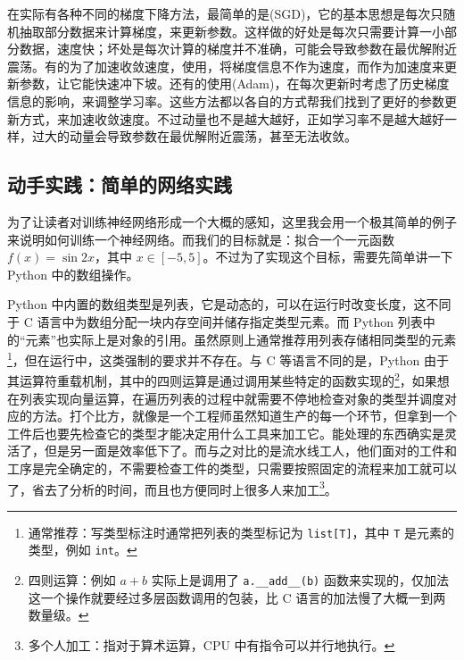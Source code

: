 在实际有各种不同的梯度下降方法，最简单的是(SGD)，它的基本思想是每次只随机抽取部分数据来计算梯度，来更新参数。这样做的好处是每次只需要计算一小部分数据，速度快；坏处是每次计算的梯度并不准确，可能会导致参数在最优解附近震荡。有的为了加速收敛速度，使用，将梯度信息不作为速度，而作为加速度来更新参数，让它能快速冲下坡。还有的使用(Adam)，在每次更新时考虑了历史梯度信息的影响，来调整学习率。这些方法都以各自的方式帮我们找到了更好的参数更新方式，来加速收敛速度。不过动量也不是越大越好，正如学习率不是越大越好一样，过大的动量会导致参数在最优解附近震荡，甚至无法收敛。

\newpage

\subsection*{动手实践：简单的网络实践}

为了让读者对训练神经网络形成一个大概的感知，这里我会用一个极其简单的例子来说明如何训练一个神经网络。而我们的目标就是：拟合一个一元函数 $f(x) = \sin 2x$，其中 $x \in [-5, 5]$。不过为了实现这个目标，需要先简单讲一下 Python 中的数组操作。

Python 中内置的数组类型是列表，它是动态的，可以在运行时改变长度，这不同于 C 语言中为数组分配一块内存空间并储存指定类型元素。而 Python 列表中的“元素”也实际上是对象的引用。虽然原则上通常推荐用列表存储相同类型的元素\footnote{通常推荐：写类型标注时通常把列表的类型标记为 \texttt{list[T]}，其中 \texttt{T} 是元素的类型，例如 \texttt{int}。}，但在运行中，这类强制的要求并不存在。与 C 等语言不同的是，Python 由于其运算符重载机制，其中的四则运算是通过调用某些特定的函数实现的\footnote{四则运算：例如 $a + b$ 实际上是调用了 \texttt{a.\_\_add\_\_(b)} 函数来实现的，仅加法这一个操作就要经过多层函数调用的包装，比 C 语言的加法慢了大概一到两数量级。}，如果想在列表实现向量运算，在遍历列表的过程中就需要不停地检查对象的类型并调度对应的方法。打个比方，就像是一个工程师虽然知道生产的每一个环节，但拿到一个工件后也要先检查它的类型才能决定用什么工具来加工它。能处理的东西确实是灵活了，但是另一面是效率低下了。而与之对比的是流水线工人，他们面对的工件和工序是完全确定的，不需要检查工件的类型，只需要按照固定的流程来加工就可以了，省去了分析的时间，而且也方便同时上很多人来加工\footnote{多个人加工：指对于算术运算，CPU 中有指令可以并行地执行。}。

